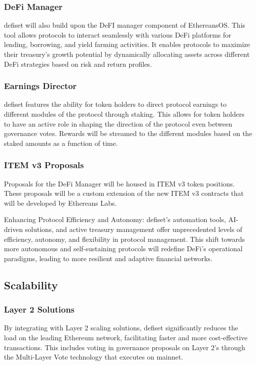 \documentclass[11pt,oneside,a4paper]{article}
\begin{document}
\subsubsection{DeFi Manager}
defiset will also build upon the DeFI manager component of EthereansOS. This tool allows protocols to interact seamlessly with various DeFi platforms for lending, borrowing, and yield farming activities. It enables protocols to maximize their treasury's growth potential by dynamically allocating assets across different DeFi strategies based on risk and return profiles.

\subsubsection{Earnings Director}
defiset features the ability for token holders to direct protocol earnings to different modules of the protocol through staking. This allows for token holders to have an active role in shaping the direction of the protocol even between governance votes. Rewards will be streamed to the different modules based on the staked amounts as a function of time.

\subsubsection{ITEM v3 Proposals}
Proposals for the DeFi Manager will be housed in ITEM v3 token positions. These proposals will be a custom extension of the new ITEM v3 contracts that will be developed by Ethereans Labs.

Enhancing Protocol Efficiency and Autonomy: defiset's automation tools, AI-driven solutions, and active treasury management offer unprecedented levels of efficiency, autonomy, and flexibility in protocol management. This shift towards more autonomous and self-sustaining protocols will redefine DeFi’s operational paradigms, leading to more resilient and adaptive financial networks.

\subsection{Scalability}

\subsubsection{Layer 2 Solutions}
By integrating with Layer 2 scaling solutions, defiset significantly reduces the load on the leading Ethereum network, facilitating faster and more cost-effective transactions. This includes voting in governance proposals on Layer 2’s through the Multi-Layer Vote technology that executes on mainnet.
\end{document}
